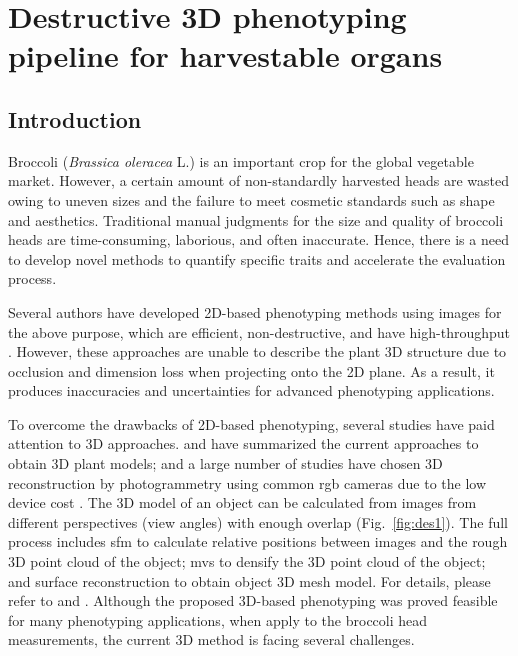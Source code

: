 \chapter{Destructive 3D phenotyping pipeline for harvestable organs}

\section{Introduction}


Broccoli (\textit{Brassica oleracea} L.) is an important crop for the global vegetable market. However, a certain amount of non-standardly harvested heads are wasted owing to uneven sizes and the failure to meet cosmetic standards such as shape and aesthetics. Traditional manual judgments for the size and quality of broccoli heads are time-consuming, laborious, and often inaccurate. Hence, there is a need to develop novel methods to quantify specific traits and accelerate the evaluation process.

Several authors have developed 2D-based phenotyping methods using images for the above purpose, which are efficient, non-destructive, and have high-throughput \citep{yang_greenness_2015,guo_easypcc_2017,zou_broccoli_2019}. However, these approaches are unable to describe the plant 3D structure due to occlusion and dimension loss when projecting onto the 2D plane. As a result, it produces inaccuracies and uncertainties for advanced phenotyping applications.

To overcome the drawbacks of 2D-based phenotyping, several studies have paid attention to 3D approaches. \citet{paulus_measuring_2019} and \citet{kochi_introduction_2021} have summarized the current approaches to obtain 3D plant models; and a large number of studies have chosen 3D reconstruction by photogrammetry using common \gls{rgb} cameras due to the low device cost \citep{xiao_estimating_2021,zermas_3d_2020,zhang_estimating_2016}. The 3D model of an object can be calculated from images from different perspectives (view angles) with enough overlap (Fig.~\ref{fig:des1}). The full process includes \gls{sfm} to calculate relative positions between images and the rough 3D point cloud of the object; \gls{mvs} to densify the 3D point cloud of the object; and surface reconstruction to obtain object 3D mesh model. For details, please refer to \citet{hartley_multiple_2000} and \citet{snavely_scene_2010}. Although the proposed 3D-based phenotyping was proved feasible for many phenotyping applications, when apply to the broccoli head measurements, the current 3D method is facing several challenges.

